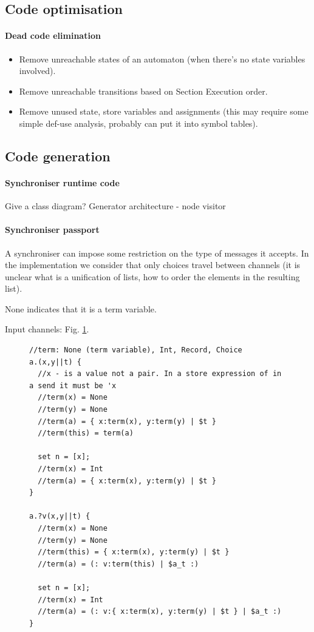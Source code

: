 \subsection{Code optimisation}
  \paragraph{Dead code elimination}
\begin{itemize}
\item Remove unreachable states of an automaton (when there's no state variables involved).

\item Remove unreachable transitions based on Section Execution order.

\item Remove unused state, store variables and assignments (this may require some simple def-use analysis, probably can put it into symbol tables).
\end{itemize}


\subsection{Code generation}
  \paragraph{Synchroniser runtime code}
Give a class diagram?
Generator architecture - node visitor

  \paragraph{Synchroniser passport}
A synchroniser can impose some restriction on the type of messages it accepts.
In the implementation we consider that only choices travel between channels (it is unclear what is a unification of lists, how to order the elements in the resulting list).

None indicates that it is a term variable.

Input channels: Fig. \ref{a}.
\begin{figure}[h!]
\begin{lstlisting}
//term: None (term variable), Int, Record, Choice
a.(x,y||t) {
  //x - is a value not a pair. In a store expression of in a send it must be 'x
  //term(x) = None
  //term(y) = None
  //term(a) = { x:term(x), y:term(y) | $t }
  //term(this) = term(a)

  set n = [x];
  //term(x) = Int
  //term(a) = { x:term(x), y:term(y) | $t }
}

a.?v(x,y||t) {
  //term(x) = None
  //term(y) = None
  //term(this) = { x:term(x), y:term(y) | $t }
  //term(a) = (: v:term(this) | $a_t :)

  set n = [x];
  //term(x) = Int
  //term(a) = (: v:{ x:term(x), y:term(y) | $t } | $a_t :)
}
\end{lstlisting}
\label{a}
\end{figure}

